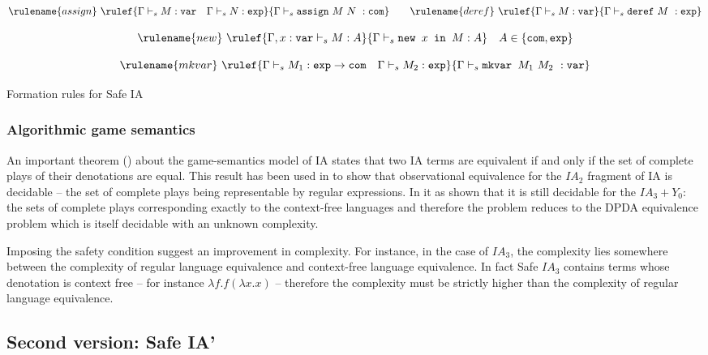 \begin{FramedTable}
$$ \rulename{assign} \ \rulef{\Gamma \vdash_s M : \texttt{var} \quad \Gamma \vdash_s N : \texttt{exp}}
    {\Gamma \vdash_s \texttt{assign}\ M\ N\ : \texttt{com}}
\qquad \rulename{deref} \
 \rulef{\Gamma \vdash_s M : \texttt{var}}
    {\Gamma \vdash_s \texttt{deref}\ M\ : \texttt{exp}}$$

$$ \rulename{new} \ \rulef{\Gamma , x : \texttt{var} \vdash_s M : A}
    {\Gamma  \vdash_s \texttt{new } x \texttt{ in } M : A} \quad A \in \{ \texttt{com}, \texttt{exp}\}$$

$$ \rulename{mkvar} \ \rulef{\Gamma \vdash_s M_1 : \texttt{exp} \rightarrow \texttt{com} \quad \Gamma \vdash_s M_2 : \texttt{exp}}
    {\Gamma \vdash_s \texttt{mkvar } M_1\ M_2\ : \texttt{var}}$$

\caption{Formation rules for Safe IA}
\label{tab:safeia_formrules}
\end{FramedTable}



\subsubsection{Algorithmic game semantics}

An important theorem (\cite{AM97a}) about the game-semantics model
of IA states that two IA terms are equivalent if and only if the set
of complete plays of their denotations are equal. This result has
been used in \cite{ghicamccusker00} to show that observational
equivalence for the $IA_2$ fragment of IA is decidable -- the set of
complete plays being representable by regular expressions. In
\cite{Ong02} it as shown that it is still decidable
 for the $IA_3+Y_0$: the sets of complete plays corresponding exactly to the context-free languages
 and therefore the problem reduces to the DPDA equivalence problem which is itself decidable with an unknown
complexity.

Imposing the safety condition suggest an improvement in complexity.
For instance, in the case of $IA_3$, the complexity lies somewhere
between the complexity of regular language equivalence and
context-free language equivalence. In fact Safe $IA_3$ contains
terms whose denotation is context free -- for instance $\lambda f .
f (\lambda x .x )$ -- therefore the complexity must be strictly
higher than the complexity of regular language equivalence.


\subsection{Second version: Safe IA'}

